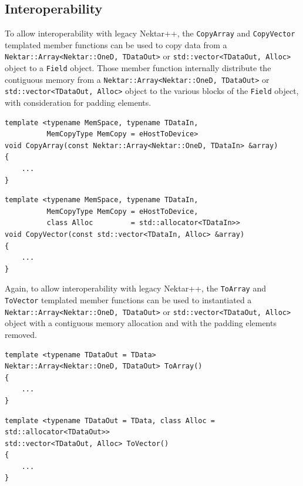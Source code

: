 \subsection{Interoperability}
To allow interoperability with legacy Nektar++, the \lstinline[style=C++Style]!CopyArray! and \lstinline[style=C++Style]!CopyVector! templated member functions can be used to copy data from a \lstinline[style=C++Style]!Nektar::Array<Nektar::OneD, TDataOut>! or \lstinline[style=C++Style]!std::vector<TDataOut, Alloc>! object to a \lstinline[style=C++Style]!Field! object. Those member function internally distribute the contiguous memory from a \lstinline[style=C++Style]!Nektar::Array<Nektar::OneD, TDataOut>! or \lstinline[style=C++Style]!std::vector<TDataOut, Alloc>! object to the various blocks of the  \lstinline[style=C++Style]!Field! object, with consideration for padding elements.

\begin{lstlisting}[style=C++Style]
template <typename MemSpace, typename TDataIn,
          MemCopyType MemCopy = eHostToDevice>
void CopyArray(const Nektar::Array<Nektar::OneD, TDataIn> &array)
{
    ...
}
\end{lstlisting}

\begin{lstlisting}[style=C++Style]
template <typename MemSpace, typename TDataIn,
          MemCopyType MemCopy = eHostToDevice,
          class Alloc         = std::allocator<TDataIn>>
void CopyVector(const std::vector<TDataIn, Alloc> &array)
{
    ...
}
\end{lstlisting}

Again, to allow interoperability with legacy Nektar++, the \lstinline[style=C++Style]!ToArray! and \lstinline[style=C++Style]!ToVector! templated member functions can be used to instantiated a \lstinline[style=C++Style]!Nektar::Array<Nektar::OneD, TDataOut>! or \lstinline[style=C++Style]!std::vector<TDataOut, Alloc>! object with a contiguous memory allocation and with the padding elements removed.
\begin{lstlisting}[style=C++Style]
template <typename TDataOut = TData>
Nektar::Array<Nektar::OneD, TDataOut> ToArray()
{
    ...
}
\end{lstlisting}

\begin{lstlisting}[style=C++Style]
template <typename TDataOut = TData, class Alloc = std::allocator<TDataOut>>
std::vector<TDataOut, Alloc> ToVector()
{
    ...
}
\end{lstlisting}

